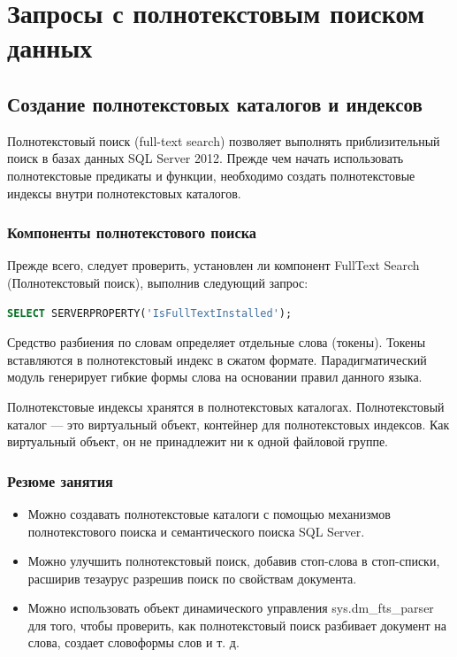 \chapter{Запросы с полнотекстовым поиском данных}	
\section{Создание полнотекстовых каталогов и индексов}

Полнотекстовый поиск (full-text search) позволяет выполнять приблизительный поиск в базах данных SQL Server 2012. Прежде чем начать использовать полнотекстовые предикаты и функции, необходимо создать полнотекстовые индексы внутри полнотекстовых каталогов. 


\subsection{Компоненты полнотекстового поиска}
Прежде всего, следует проверить, установлен ли компонент FullText Search (Полнотекстовый поиск), выполнив следующий запрос:


\begin{lstlisting}[label=lst:funcReturn, language=sql]
	SELECT SERVERPROPERTY('IsFullTextInstalled'); 
\end{lstlisting}

Средство разбиения по словам
определяет отдельные слова (токены). Токены вставляются в полнотекстовый индекс в сжатом формате. Парадигматический модуль генерирует гибкие
формы слова на основании правил данного языка. 

Полнотекстовые индексы хранятся в полнотекстовых
каталогах. Полнотекстовый каталог — это виртуальный объект, контейнер для
полнотекстовых индексов. Как виртуальный объект, он не принадлежит ни к одной
файловой группе.


\subsection*{Резюме занятия}
\begin{itemize}
	\item Можно создавать полнотекстовые каталоги с помощью механизмов полнотекстового поиска и семантического поиска SQL Server. 
	\item Можно улучшить полнотекстовый поиск, добавив стоп-слова в стоп-списки,
	расширив тезаурус разрешив поиск по свойствам документа. 
	\item Можно использовать объект динамического управления sys.dm\_fts\_parser для
	того, чтобы проверить, как полнотекстовый поиск разбивает документ на слова,
	создает словоформы слов и т. д.
\end{itemize}

